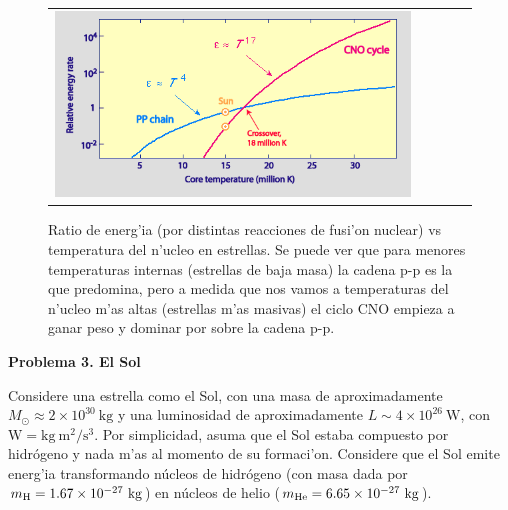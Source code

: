 \documentclass{article}
\begin{document}
\begin{figure}[!ht]
\begin{center}
\begin{tabular}{ll}
  \includegraphics[width=0.9\textwidth]{comparison.png} 
\end{tabular}
\caption{{\small Ratio de energ'ia (por distintas reacciones de fusi'on nuclear) vs temperatura del n'ucleo en estrellas. Se puede ver que para menores temperaturas internas (estrellas de baja masa) la cadena p-p es la que predomina, pero a medida que nos vamos a temperaturas del n'ucleo m'as altas (estrellas m'as masivas) el ciclo CNO empieza a ganar peso y dominar por sobre la cadena p-p.}}\label{comparison}
\end{center} 
\end{figure}

\newpage

\textbf{Problema 3. El Sol}

\vspace{3mm}


Considere una estrella como el Sol, con una masa de aproximadamente $M_\odot \approx 2 \times 10^{30} \ \text{kg}$ y una luminosidad de aproximadamente $L \sim 4 \times 10^{26} \ \text{W}$, con $\text{W} = \text{kg} \ \text{m}^2/\text{s}^3$. Por simplicidad, asuma que el Sol estaba
compuesto por hidrógeno y nada m'as al momento de su formaci'on. Considere que el Sol emite energ'ia
transformando núcleos de hidrógeno (con masa dada por $m_{\rm H} = 1.67 \times 10^{-27} \ \text{kg}$) en núcleos de helio ($m_{\rm He} = 6.65 \times 10^{-27} \ \text{kg}$).
\end{document}
